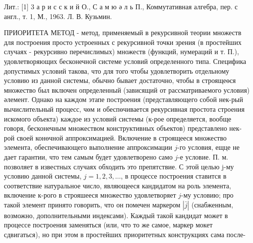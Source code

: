 \documentclass[10pt]{article}
\begin{document}
Лит.: [1] 3 а р и с с к и й О., С а м ю ә л ь П., Коммутативная алгебра, пер. с англ., т. 1, М., 1963. Л. В. Кузьмин.



ПРИОРИТЕТА МЕТОД - метод, применяемый в рекурсивной теории множеств для построения просто устроенных с рекурсивной точки зрения (в простейших случаях - рекурсивно перечислимых) множеств (функций, нумераций и т. П.), удовлетворяющих бесконечной системе условий определенного типа. Специфика допустимых условий такова, что для того чтобы удовлетворить отдельному условию из данной системы, обычно бывает достаточно, чтобы в строящеөся множество был включен определенный (зависящий от рассматриваемого условия) әлемент. Однако на каждом этапе построения (представляющего собой нек-рый вычислительный процесс, чөм и обеспөчивается рекурсивная простота строения искомого объекта) каждое из условий системы (к-рое определяется, вообще говоря, бесконечным множеством конструктивных объектов) представлено нек-рой своей конөчной аппроксимацией. Включение в строящееся множество элемента, обеспечивающего выполнение аппроксимации $j$-го условия, ещце не дает гарантии, что тем самым будет удовлетворено само $j$-е условие. П. м. позволяет в известных случаях обходить это препятствие. С этой целью j-му условию данной системы, $j=1,2,3, \ldots$, в процессе построения ставится в соответствие натуральное число, являющееся кандидатом на роль элемента, включение к-рого в строяшееся множество удовлетворяет $j$-му условию; про такой элемент принято говорить, что он помечен маркером $|\bar{j}|$ (снабженным, возможно, дополнительными индексами). Каждый такой кандидат может в процессе построения заменяться (или, что то же самое, маркер мокет сдвигаться), но при этом в простейших приоритетных конструкциях сама после-
\end{document}
